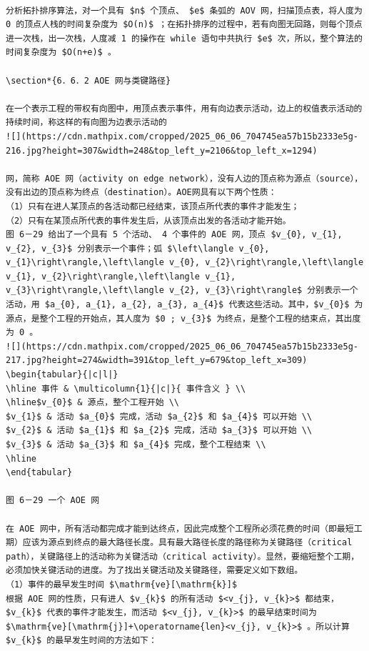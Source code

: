 \documentclass[10pt]{article}
\begin{document}
\begin{verbatim}

分析拓扑排序算法，对一个具有 $n$ 个顶点、 $e$ 条弧的 AOV 网，扫描顶点表，将人度为 0 的顶点人栈的时间复杂度为 $O(n)$ ；在拓扑排序的过程中，若有向图无回路，则每个顶点进一次栈，出一次栈，人度减 1 的操作在 while 语句中共执行 $e$ 次，所以，整个算法的时间复杂度为 $O(n+e)$ 。

\section*{6．6．2 AOE 网与类键路径}

在一个表示工程的带权有向图中，用顶点表示事件，用有向边表示活动，边上的权值表示活动的持续时间，称这样的有向图为边表示活动的
![](https://cdn.mathpix.com/cropped/2025_06_06_704745ea57b15b2333e5g-216.jpg?height=307&width=248&top_left_y=2106&top_left_x=1294)

网，简称 AOE 网（activity on edge network），没有人边的顶点称为源点（source），没有出边的顶点称为终点（destination）。AOE网具有以下两个性质：
（1）只有在进人某顶点的各活动都已经结束，该顶点所代表的事件才能发生；
（2）只有在某顶点所代表的事件发生后，从该顶点出发的各活动才能开始。
图 6－29 给出了一个具有 5 个活动、 4 个事件的 AOE 网，顶点 $v_{0}, v_{1}, v_{2}, v_{3}$ 分别表示一个事件；弧 $\left\langle v_{0}, v_{1}\right\rangle,\left\langle v_{0}, v_{2}\right\rangle,\left\langle v_{1}, v_{2}\right\rangle,\left\langle v_{1}, v_{3}\right\rangle,\left\langle v_{2}, v_{3}\right\rangle$ 分别表示一个活动，用 $a_{0}, a_{1}, a_{2}, a_{3}, a_{4}$ 代表这些活动。其中，$v_{0}$ 为源点，是整个工程的开始点，其人度为 $0 ; v_{3}$ 为终点，是整个工程的结束点，其出度为 0 。
![](https://cdn.mathpix.com/cropped/2025_06_06_704745ea57b15b2333e5g-217.jpg?height=274&width=391&top_left_y=679&top_left_x=309)
\begin{tabular}{|c|l|}
\hline 事件 & \multicolumn{1}{|c|}{ 事件含义 } \\
\hline$v_{0}$ & 源点，整个工程开始 \\
$v_{1}$ & 活动 $a_{0}$ 完成，活动 $a_{2}$ 和 $a_{4}$ 可以开始 \\
$v_{2}$ & 活动 $a_{1}$ 和 $a_{2}$ 完成，活动 $a_{3}$ 可以开始 \\
$v_{3}$ & 活动 $a_{3}$ 和 $a_{4}$ 完成，整个工程结束 \\
\hline
\end{tabular}

图 6－29 一个 AOE 网

在 AOE 网中，所有活动都完成才能到达终点，因此完成整个工程所必须花费的时间（即最短工期）应该为源点到终点的最大路径长度。具有最大路径长度的路径称为关键路径（critical path），关键路径上的活动称为关键活动（critical activity）。显然，要缩短整个工期，必须加快关键活动的进度。为了找出关键活动及关键路径，需要定义如下数组。
（1）事件的最早发生时间 $\mathrm{ve}[\mathrm{k}]$
根据 AOE 网的性质，只有进人 $v_{k}$ 的所有活动 $<v_{j}, v_{k}>$ 都结束，$v_{k}$ 代表的事件才能发生，而活动 $<v_{j}, v_{k}>$ 的最早结束时间为 $\mathrm{ve}[\mathrm{j}]+\operatorname{len}<v_{j}, v_{k}>$ 。所以计算 $v_{k}$ 的最早发生时间的方法如下：


\end{verbatim}
\end{document}
